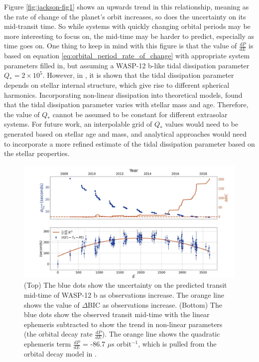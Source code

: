 \documentclass[oneside,12pt]{amsart}
\numberwithin{page}{section}
\begin{document}
Figure \ref{fig:jackson-fig1} shows an upwards trend in this relationship, meaning as the rate of change of the planet's orbit increases, so does the uncertainty on its mid-transit time. So while systems with quickly changing orbital periods may be more interesting to focus on, the mid-time may be harder to predict, especially as time goes on. One thing to keep in mind with this figure is that the value of $\frac{dP}{dE}$ is based on equation \ref{eq:orbital_period_rate_of_change} with appropriate system parameters filled in, but assuming a WASP-12 b-like tidal dissipation parameter $Q_* = 2 \times 10^5$. However, in \citet{ogilvie2014tidal}, it is shown that the tidal dissipation parameter depends on stellar internal structure, which give rise to different spherical harmonics. Incorporating non-linear dissipation into theoretical models, \citet{weinberg2023orbital} found that the tidal dissipation parameter varies with stellar mass and age. Therefore, the value of $Q_*$ cannot be assumed to be constant for different extrasolar systems. For future work, an interpolable grid of $Q_*$ values would need to be generated based on stellar age and mass, and analytical approaches would need to incorporate a more refined estimate of the tidal dissipation parameter based on the stellar properties.

\begin{figure}[htbp]
    \centering
    \includegraphics[width=\linewidth]{figs/jackson_fig2.png}
    \caption{(Top) The blue dots show the uncertainty on the predicted transit mid-time of WASP-12 b as observations increase. The orange line shows the value of $\Delta$BIC as observations increase. (Bottom) The blue dots show the observed transit mid-time with the linear ephemeris subtracted to show the trend in non-linear parameters (the orbital decay rate $\frac{dP}{dE}$). The orange line shows the quadratic ephemeris term $\frac{dP}{dE}$ = -86.7 $\mu$s orbit$^{-1}$, which is pulled from the orbital decay model in \citet{yee2019orbit}.}
    \label{fig:jackson_fig2}
\end{figure}
\end{document}
